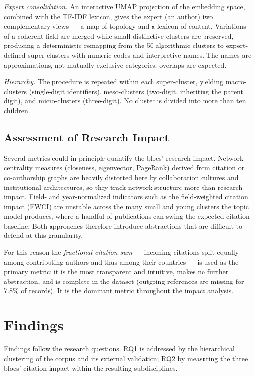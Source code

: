 \documentclass{article}
\begin{document}
	\textit{Expert consolidation.} An interactive UMAP projection of the embedding space, combined with the TF-IDF lexicon, gives the expert (an author) two complementary views --- a map of topology and a lexicon of content. Variations of a coherent field are merged while small distinctive clusters are preserved, producing a deterministic remapping from the 50 algorithmic clusters to expert-defined super-clusters with numeric codes and interpretive names. The names are approximations, not mutually exclusive categories; overlaps are expected.
	
	\textit{Hierarchy.} The procedure is repeated within each super-cluster, yielding macro-clusters (single-digit identifiers), meso-clusters (two-digit, inheriting the parent digit), and micro-clusters (three-digit). No cluster is divided into more than ten children.
	
	\subsection{Assessment of Research Impact}
	\label{national_reserach_authority}
	
	Several metrics could in principle quantify the blocs' research impact. Network-centrality measures (closeness, eigenvector, PageRank) derived from citation or co-authorship graphs are heavily distorted here by collaboration cultures and institutional architectures, so they track network structure more than research impact. Field- and year-normalized indicators such as the field-weighted citation impact (FWCI) are unstable across the many small and young clusters the topic model produces, where a handful of publications can swing the expected-citation baseline. Both approaches therefore introduce abstractions that are difficult to defend at this granularity.
	
	For this reason the \textit{fractional citation sum} --- incoming citations split equally among contributing authors and thus among their countries --- is used as the primary metric: it is the most transparent and intuitive, makes no further abstraction, and is complete in the dataset (outgoing references are missing for 7.8\% of records). It is the dominant metric throughout the impact analysis.
	
	\section{Findings}
	\label{sec:findings}
	
	Findings follow the research questions. RQ1 is addressed by the hierarchical clustering of the corpus and its external validation; RQ2 by measuring the three blocs' citation impact within the resulting subdisciplines.
	
\end{document}
